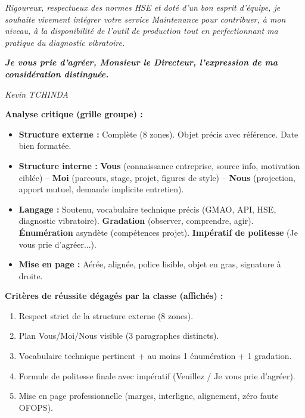 \documentclass[11pt]{article}
\begin{document}
\begin{exoresolu}
\par
\emph{Rigoureux, respectueux des normes HSE et doté d'un bon esprit d'équipe, je souhaite vivement intégrer votre service Maintenance pour contribuer, à mon niveau, à la disponibilité de l'outil de production tout en perfectionnant ma pratique du diagnostic vibratoire.}
\par
\emph{\textbf{Je vous prie d'agréer, Monsieur le Directeur, l'expression de ma considération distinguée.}}
\par
\vspace{0.5cm}
\par
\emph{\hfill Kevin TCHINDA}

\par
\textbf{Analyse critique (grille groupe) :}
\begin{itemize}
    \item \textbf{Structure externe :} Complète (8 zones). Objet précis avec référence. Date bien formatée.
    \item \textbf{Structure interne :} \textbf{Vous} (connaissance entreprise, source info, motivation ciblée) -- \textbf{Moi} (parcours, stage, projet, figures de style) -- \textbf{Nous} (projection, apport mutuel, demande implicite entretien).
    \item \textbf{Langage :} Soutenu, vocabulaire technique précis (GMAO, API, HSE, diagnostic vibratoire). \textbf{Gradation} (\og{}observer, comprendre, agir\fg{}). \textbf{Énumération} asyndète (compétences projet). \textbf{Impératif de politesse} (\og{}Je vous prie d'agréer...\fg{}).
    \item \textbf{Mise en page :} Aérée, alignée, police lisible, objet en gras, signature à droite.
\end{itemize}

\par
\textbf{Critères de réussite dégagés par la classe (affichés) :}
\begin{enumerate}
    \item Respect strict de la structure externe (8 zones).
    \item Plan Vous/Moi/Nous visible (3 paragraphes distincts).
    \item Vocabulaire technique pertinent + au moins 1 énumération + 1 gradation.
    \item Formule de politesse finale avec impératif (Veuillez / Je vous prie d'agréer).
    \item Mise en page professionnelle (marges, interligne, alignement, zéro faute OFOPS).
\end{enumerate}


\end{exoresolu}
\end{document}
